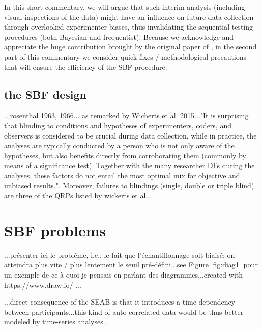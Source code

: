 \documentclass[a4paper,man,natbib,floatsintext,donotrepeattitle]{apa6}
\begin{document}
In this short commentary, we will argue that such interim analysis (including visual inspections of the data) might have an influence on future data collection through overlooked experimenter biases, thus invalidating the sequential testing procedures (both Bayesian and frequentist). Because we acknowledge and appreciate the huge contribution brought by the original paper of \cite{schonbrodt_sequential_2017}, in the second part of this commentary we consider quick fixes / methodological precautions that will ensure the efficiency of the SBF procedure.

\subsection{the SBF design}

...rosenthal 1963, 1966... as remarked by Wicherts et al. 2015..."It is surprising that blinding to conditions and hypotheses of experimenters, coders, and observers is considered to be crucial during data collection, while in practice, the analyses are typically conducted by a person who is not only aware of the hypotheses, but also benefits directly from corroborating them (commonly by means of a significance test). Together with the many researcher DFs during the analyses, these factors do not entail the most optimal mix for objective and unbiased results.". Moreover, failures to blindings (single, double or triple blind) are three of the QRPs listed by wickerts et al...

\section{SBF problems}

...présenter ici le problème, i.e., le fait que l'échantillonnage soit biaisé: on atteindra plus vite / plus lentement le seuil pré-défini...see Figure \ref{fig:diag1} pour un exemple de ce à quoi je pensais en parlant des diagrammes...created with https://www.draw.io/ ...

...direct consequence of the SEAB is that it introduces a time dependency between participants...this kind of auto-correlated data would be thus better modeled by time-series analyses...
\end{document}
